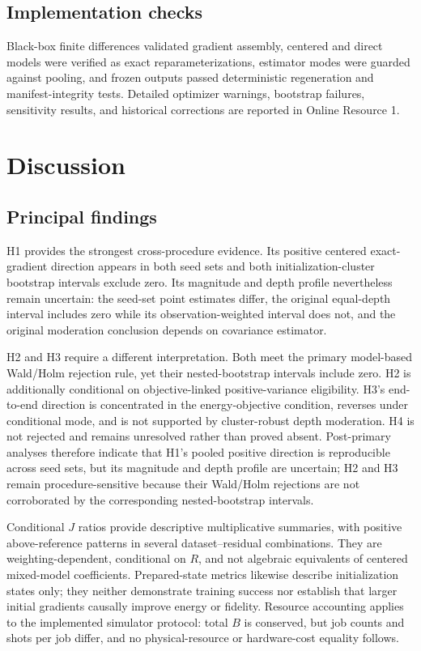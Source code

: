 \documentclass[pdflatex,sn-basic,Numbered]{sn-jnl}
\begin{document}
\subsection{Implementation checks}\label{sec:results-robustness}

Black-box finite differences validated gradient assembly, centered and direct models were verified as exact reparameterizations, estimator modes were guarded against pooling, and frozen outputs passed deterministic regeneration and manifest-integrity tests. Detailed optimizer warnings, bootstrap failures, sensitivity results, and historical corrections are reported in Online Resource 1.

\section{Discussion}

\subsection{Principal findings}

H1 provides the strongest cross-procedure evidence. Its positive centered exact-gradient direction appears in both seed sets and both initialization-cluster bootstrap intervals exclude zero. Its magnitude and depth profile nevertheless remain uncertain: the seed-set point estimates differ, the original equal-depth interval includes zero while its observation-weighted interval does not, and the original moderation conclusion depends on covariance estimator.

H2 and H3 require a different interpretation. Both meet the primary model-based Wald/Holm rejection rule, yet their nested-bootstrap intervals include zero. H2 is additionally conditional on objective-linked positive-variance eligibility. H3's end-to-end direction is concentrated in the energy-objective condition, reverses under conditional mode, and is not supported by cluster-robust depth moderation. H4 is not rejected and remains unresolved rather than proved absent. Post-primary analyses therefore indicate that H1's pooled positive direction is reproducible across seed sets, but its magnitude and depth profile are uncertain; H2 and H3 remain procedure-sensitive because their Wald/Holm rejections are not corroborated by the corresponding nested-bootstrap intervals.

Conditional $J$ ratios provide descriptive multiplicative summaries, with positive above-reference patterns in several dataset--residual combinations. They are weighting-dependent, conditional on $R$, and not algebraic equivalents of centered mixed-model coefficients. Prepared-state metrics likewise describe initialization states only; they neither demonstrate training success nor establish that larger initial gradients causally improve energy or fidelity. Resource accounting applies to the implemented simulator protocol: total $B$ is conserved, but job counts and shots per job differ, and no physical-resource or hardware-cost equality follows.
\end{document}
